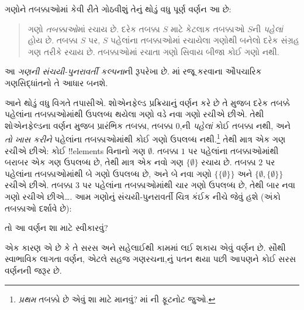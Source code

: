 \documentclass[../../../include/open-logic-section]{subfiles}
\begin{document}

ગણોને તબક્કાઓમાં કેવી રીતે ગોઠવીશું તેનું થોડું વધુ પૂર્ણ વર્ણન
આ છે:
\begin{quote}
ગણો \emph{તબક્કાઓ}માં રચાય છે. દરેક તબક્કા $S$ માટે કેટલાક
તબક્કાઓ $S$ની \emph{પહેલાં} હોય છે. તબક્કા $S$ પર, $S$ પહેલાંના
તબક્કાઓમાં રચાયેલા ગણોથી બનેલો દરેક સંગ્રહ ગણ તરીકે રચાય છે.
તબક્કાઓમાં રચાતા ગણો સિવાય બીજા કોઈ ગણો નથી.
\citep[p.~323]{Shoenfield:AST}
\end{quote}
આ \emph{ગણની સંચયી-પુનરાવર્તી કલ્પના}ની રૂપરેખા છે.
માં રજૂ કરવાના ઔપચારિક ગણસિદ્ધાંતનો તે
આધાર બનશે.

આને થોડું વધુ વિગતે તપાસીએ. શોએનફેલ્ડ પ્રક્રિયાનું વર્ણન કરે છે
તે મુજબ દરેક તબક્કે પહેલાંના તબક્કાઓમાંથી ઉપલબ્ધ થયેલા ગણો
વડે નવા ગણો રચીએ છીએ. તેથી શોએનફેલ્ડના વર્ણન મુજબ પ્રારંભિક
તબક્કા, તબક્કા $0$,ની \emph{પહેલાં} કોઈ તબક્કા નથી, અને
\emph{તો ખાસ કરીને} પહેલાંના તબક્કાઓમાંથી કોઈ ગણો ઉપલબ્ધ
નથી.\footnote{\emph{પ્રથમ} તબક્કો છે એવું શા માટે માનવું?
માં \stagesord{}ની ફૂટનોટ જુઓ.}
તેથી માત્ર એક ગણ રચીએ છીએ: કોઈ !!{element}s વિનાનો ગણ
$\emptyset$. તબક્કા $1$ પર પહેલાંના તબક્કાઓમાંથી બરાબર એક ગણ
ઉપલબ્ધ છે, તેથી માત્ર એક નવો ગણ $\{\emptyset\}$ રચાય છે.
તબક્કા $2$ પર પહેલાંના તબક્કાઓમાંથી બે ગણો ઉપલબ્ધ છે, અને
બે નવા ગણો $\{\{\emptyset\}\}$ અને
$\{\emptyset, \{\emptyset\}\}$ રચીએ છીએ. તબક્કા $3$ પર
પહેલાંના તબક્કાઓમાંથી ચાર ગણો ઉપલબ્ધ છે, તેથી બાર નવા ગણો
રચીએ છીએ\ldots. આમ ગણોનું સંચયી-પુનરાવર્તી ચિત્ર કંઈક નીચે
જેવું હશે (અંકો તબક્કાઓ દર્શાવે છે):
\begin{center}
\end{center}
તો આ વર્ણન શા માટે સ્વીકારવું?

એક કારણ એ છે કે તે સરસ અને સહેલાઈથી કામમાં લઈ શકાય એવું વર્ણન
છે. સૌથી સ્વાભાવિક લાગતા વર્ણન, એટલે સહજ ગણરચના,નું પતન થયા
પછી આપણને કોઈ સરસ વર્ણનની જરૂર છે.
\end{document}
